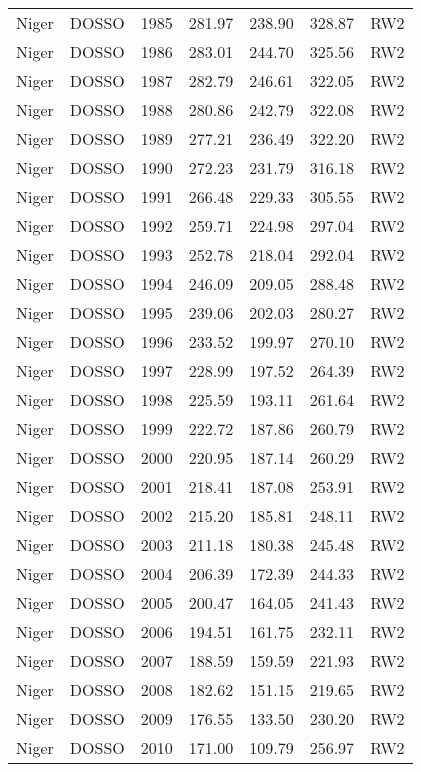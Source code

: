 \begin{longtable}{lllrrrl}
  Niger & DOSSO & 1985 & 281.97 & 238.90 & 328.87 & RW2 \\ 
  Niger & DOSSO & 1986 & 283.01 & 244.70 & 325.56 & RW2 \\ 
  Niger & DOSSO & 1987 & 282.79 & 246.61 & 322.05 & RW2 \\ 
  Niger & DOSSO & 1988 & 280.86 & 242.79 & 322.08 & RW2 \\ 
  Niger & DOSSO & 1989 & 277.21 & 236.49 & 322.20 & RW2 \\ 
  Niger & DOSSO & 1990 & 272.23 & 231.79 & 316.18 & RW2 \\ 
  Niger & DOSSO & 1991 & 266.48 & 229.33 & 305.55 & RW2 \\ 
  Niger & DOSSO & 1992 & 259.71 & 224.98 & 297.04 & RW2 \\ 
  Niger & DOSSO & 1993 & 252.78 & 218.04 & 292.04 & RW2 \\ 
  Niger & DOSSO & 1994 & 246.09 & 209.05 & 288.48 & RW2 \\ 
  Niger & DOSSO & 1995 & 239.06 & 202.03 & 280.27 & RW2 \\ 
  Niger & DOSSO & 1996 & 233.52 & 199.97 & 270.10 & RW2 \\ 
  Niger & DOSSO & 1997 & 228.99 & 197.52 & 264.39 & RW2 \\ 
  Niger & DOSSO & 1998 & 225.59 & 193.11 & 261.64 & RW2 \\ 
  Niger & DOSSO & 1999 & 222.72 & 187.86 & 260.79 & RW2 \\ 
  Niger & DOSSO & 2000 & 220.95 & 187.14 & 260.29 & RW2 \\ 
  Niger & DOSSO & 2001 & 218.41 & 187.08 & 253.91 & RW2 \\ 
  Niger & DOSSO & 2002 & 215.20 & 185.81 & 248.11 & RW2 \\ 
  Niger & DOSSO & 2003 & 211.18 & 180.38 & 245.48 & RW2 \\ 
  Niger & DOSSO & 2004 & 206.39 & 172.39 & 244.33 & RW2 \\ 
  Niger & DOSSO & 2005 & 200.47 & 164.05 & 241.43 & RW2 \\ 
  Niger & DOSSO & 2006 & 194.51 & 161.75 & 232.11 & RW2 \\ 
  Niger & DOSSO & 2007 & 188.59 & 159.59 & 221.93 & RW2 \\ 
  Niger & DOSSO & 2008 & 182.62 & 151.15 & 219.65 & RW2 \\ 
  Niger & DOSSO & 2009 & 176.55 & 133.50 & 230.20 & RW2 \\ 
  Niger & DOSSO & 2010 & 171.00 & 109.79 & 256.97 & RW2 \\ 

\end{longtable}
